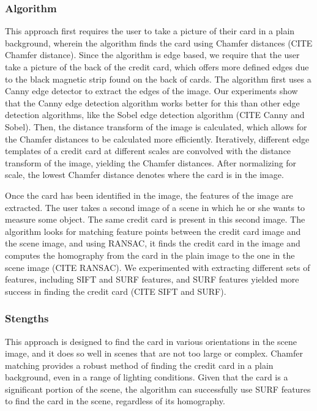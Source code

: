 \documentclass[10pt,twocolumn,letterpaper]{article}
\begin{document}
\subsubsection{Algorithm}
This approach first requires the user to take a picture of their card in a plain background, wherein the algorithm finds the card using Chamfer distances (CITE Chamfer distance). Since the algorithm is edge based, we require that the user take a picture of the back of the credit card, which offers more defined edges due to the black magnetic strip found on the back of cards. The algorithm first uses a Canny edge detector to extract the edges of the image. Our experiments show that the Canny edge detection algorithm works better for this than other edge detection algorithms, like the Sobel edge detection algorithm (CITE Canny and Sobel). Then, the distance transform of the image is calculated, which allows for the Chamfer distances to be calculated more efficiently. Iteratively, different edge templates of a credit card at different scales are convolved with the distance transform of the image, yielding the Chamfer distances. After normalizing for scale, the lowest Chamfer distance denotes where the card is in the image.

Once the card has been identified in the image, the features of the image are extracted. The user takes a second image of a scene in which he or she wants to measure some object. The same credit card is present in this second image. The algorithm looks for matching feature points between the credit card image and the scene image, and using RANSAC, it finds the credit card in the image and computes the homography from the card in the plain image to the one in the scene image (CITE RANSAC). We experimented with extracting different sets of features, including SIFT and SURF features, and SURF features yielded more success in finding the credit card (CITE SIFT and SURF). 

\subsubsection{Stengths}
	This approach is designed to find the card in various orientations in the scene image, and it does so well in scenes that are not too large or complex. Chamfer matching provides a robust method of finding the credit card in a plain background, even in a range of lighting conditions. Given that the card is a significant portion of the scene, the algorithm can successfully use SURF features to find the card in the scene, regardless of its homography. 
	
\end{document}
